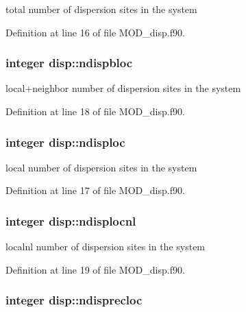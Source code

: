 total number of dispersion sites in the system 



Definition at line 16 of file M\-O\-D\-\_\-disp.\-f90.

\hypertarget{classdisp_a2db13494e3d4f5d8b8868a4ad7f36cca}{
\subsubsection[{ndispbloc}]{\setlength{\rightskip}{0pt plus 5cm}integer disp\-::ndispbloc}}\label{classdisp_a2db13494e3d4f5d8b8868a4ad7f36cca}


local+neighbor number of dispersion sites in the system 



Definition at line 18 of file M\-O\-D\-\_\-disp.\-f90.

\hypertarget{classdisp_aba0f5019751df13bd9365c07af9072ff}{
\subsubsection[{ndisploc}]{\setlength{\rightskip}{0pt plus 5cm}integer disp\-::ndisploc}}\label{classdisp_aba0f5019751df13bd9365c07af9072ff}


local number of dispersion sites in the system 



Definition at line 17 of file M\-O\-D\-\_\-disp.\-f90.

\hypertarget{classdisp_a84ad104bb3cd00368e6dce2c46a6443b}{
\subsubsection[{ndisplocnl}]{\setlength{\rightskip}{0pt plus 5cm}integer disp\-::ndisplocnl}}\label{classdisp_a84ad104bb3cd00368e6dce2c46a6443b}


localnl number of dispersion sites in the system 



Definition at line 19 of file M\-O\-D\-\_\-disp.\-f90.

\hypertarget{classdisp_a5db554a09f47094dd69a4ff7b4bc2061}{
\subsubsection[{ndisprecloc}]{\setlength{\rightskip}{0pt plus 5cm}integer disp\-::ndisprecloc}}\label{classdisp_a5db554a09f47094dd69a4ff7b4bc2061}


